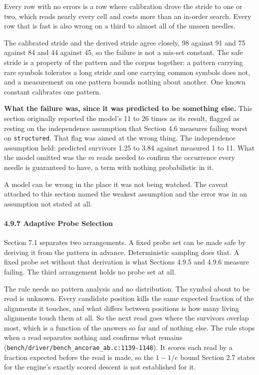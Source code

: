Every row with no errors is a row where calibration drove the stride to one or two, which reads nearly every cell and costs more than an in-order search. Every row that is fast is also wrong on a third to almost all of the unseen needles.

The calibrated stride and the derived stride agree closely, 98 against 91 and 75 against 84 and 44 against 45, so the failure is not a mis-set constant. The safe stride is a property of the pattern and the corpus together: a pattern carrying rare symbols tolerates a long stride and one carrying common symbols does not, and a measurement on one pattern bounds nothing about another. One known constant calibrates one pattern.

\noindent\textbf{What the failure was, since it was predicted to be something else.} This section originally reported the model's 11 to 26 times as its result, flagged as resting on the independence assumption that Section 4.6 measures failing worst on \texttt{structured}. That flag was aimed at the wrong thing. The independence assumption held: predicted survivors 1.25 to 3.84 against measured 1 to 11. What the model omitted was the \(m\) reads needed to confirm the occurrence every needle is guaranteed to have, a term with nothing probabilistic in it.

A model can be wrong in the place it was not being watched. The caveat attached to this section named the weakest assumption and the error was in an assumption not stated at all.

\paragraph{4.9.7 Adaptive Probe Selection}

Section 7.1 separates two arrangements. A fixed probe set can be made safe by deriving it from the pattern in advance. Deterministic sampling does that. A fixed probe set without that derivation is what Sections 4.9.5 and 4.9.6 measure failing. The third arrangement holds no probe set at all.

The rule needs no pattern analysis and no distribution. The symbol about to be read is unknown. Every candidate position kills the same expected fraction of the alignments it touches, and what differs between positions is how many living alignments touch them at all. So the next read goes where the survivors overlap most, which is a function of the answers so far and of nothing else. The rule stops when a read separates nothing and confirms what remains (\texttt{bench/\allowbreak{}driver/\allowbreak{}bench\_\allowbreak{}ancorae\_\allowbreak{}ab.\allowbreak{}c:1139-\allowbreak{}1148}). It scores each read by a fraction expected before the read is made, so the \(1 - 1/e\) bound Section 2.7 states for the engine's exactly scored descent is not established for it.

